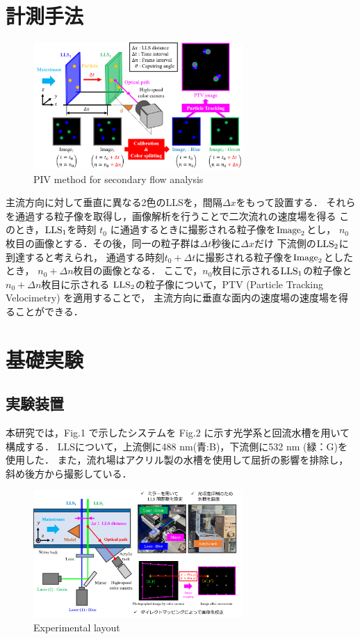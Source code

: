 \documentclass[twocolumn,a4j]{jsarticle}
\begin{document}
\section{計測手法}
\begin{figure}[htbp]
  \centering
  \includegraphics[keepaspectratio, width=80mm]{../images/PIVMethodforSecondaryFlow.png}
  \caption{PIV method for secondary flow analysis}
\end{figure}

主流方向に対して垂直に異なる2色のLLSを，間隔$\Delta x$をもって設置する．
それらを通過する粒子像を取得し，画像解析を行うことで二次流れの速度場を得る
このとき，$\rm{LLS}_1$を時刻 $t_0$ に通過するときに撮影される粒子像を$\rm{Image}_2$とし，
$n_0$ 枚目の画像とする．その後，同一の粒子群は$\Delta t$秒後に$\Delta x$だけ
下流側の$\rm{LLS}_2$に到達すると考えられ，
通過する時刻$t_0 + \Delta t$に撮影される粒子像を$\rm{Image}_2$としたとき，
$n_0 + \Delta n$枚目の画像となる．
ここで，$n_0$枚目に示される$\rm{LLS}_1$の粒子像と$n_0 + \Delta n$枚目に示される
$\rm{LLS}_2$の粒子像について，PTV (Particle Tracking Velocimetry) を適用することで，
主流方向に垂直な面内の速度場の速度場を得ることができる．

\setcounter{section}{3}
\section{基礎実験}
\subsection{実験装置}
本研究では，Fig.1 で示したシステムを Fig.2 に示す光学系と回流水槽を用いて構成する．
LLSについて，上流側に488 nm(青:B)，下流側に532 nm (緑：G)を使用した．
また，流れ場はアクリル製の水槽を使用して屈折の影響を排除し，斜め後方から撮影している．\\

\begin{figure}[htbp]
  \centering
  \includegraphics[keepaspectratio, width=80mm]{../images/ExperimentalLayout.png}
  \caption{Experimental layout}
\end{figure}
\end{document}

